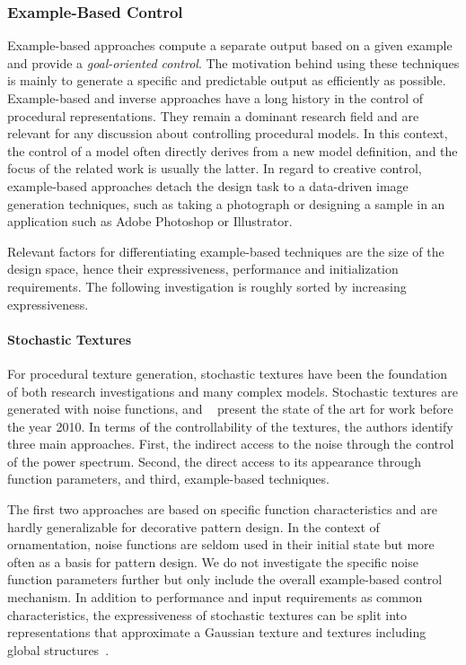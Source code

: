 \subsubsection{Example-Based Control}

Example-based approaches compute a separate output based on a given example and provide a \textit{goal-oriented control}. The motivation behind using these techniques is mainly to generate a specific and predictable output as efficiently as possible. Example-based and inverse approaches have a long history in the control of procedural representations. They remain a dominant research field and are relevant for any discussion about controlling procedural models. In this context, the control of a model often directly derives from a new model definition, and the focus of the related work is usually the latter. In regard to creative control, example-based approaches detach the design task to a data-driven image generation techniques, such as taking a photograph or designing a sample in an application such as Adobe Photoshop or Illustrator.

Relevant factors for differentiating example-based techniques are the size of the design space, hence their expressiveness, performance and initialization requirements. The following investigation is roughly sorted by increasing expressiveness.

\paragraph{Stochastic Textures}
\label{para:analysis_example_based_stochastic}




For procedural texture generation, stochastic textures have been the foundation of both research investigations and many complex models. Stochastic textures are generated with noise functions, and \citeauthor*{lagae_2010_sap}~\cite{lagae_2010_sap} present the state of the art for work before the year 2010. In terms of the controllability of the textures, the authors identify three main approaches. First, the indirect access to the noise through the control of the power spectrum. Second, the direct access to its appearance through function parameters, and 
third, example-based techniques. 

The first two approaches are based on specific function characteristics and are hardly generalizable for decorative pattern design. In the context of ornamentation, noise functions are seldom used in their initial state but more often as a basis for pattern design. We do not investigate the specific noise function parameters further but only include the overall example-based control mechanism. In addition to performance and input requirements as common characteristics, the expressiveness of stochastic textures can be split into representations that approximate a Gaussian texture and textures including global structures~\cite{galerne_2017_tno,lagae_2010_sap}.

